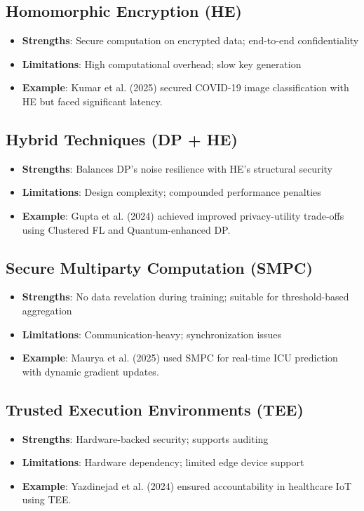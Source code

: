\documentclass[12pt]{report}
\begin{document}
\subsection{Homomorphic Encryption (HE)}
\begin{itemize}
    \item \textbf{Strengths}: Secure computation on encrypted data; end-to-end confidentiality
    \item \textbf{Limitations}: High computational overhead; slow key generation
    \item \textbf{Example}: Kumar et al. (2025) secured COVID-19 image classification with HE but faced significant latency.
\end{itemize}

\subsection{Hybrid Techniques (DP + HE)}
\begin{itemize}
    \item \textbf{Strengths}: Balances DP’s noise resilience with HE’s structural security
    \item \textbf{Limitations}: Design complexity; compounded performance penalties
    \item \textbf{Example}: Gupta et al. (2024) achieved improved privacy-utility trade-offs using Clustered FL and Quantum-enhanced DP.
\end{itemize}

\subsection{Secure Multiparty Computation (SMPC)}
\begin{itemize}
    \item \textbf{Strengths}: No data revelation during training; suitable for threshold-based aggregation
    \item \textbf{Limitations}: Communication-heavy; synchronization issues
    \item \textbf{Example}: Maurya et al. (2025) used SMPC for real-time ICU prediction with dynamic gradient updates.
\end{itemize}

\subsection{Trusted Execution Environments (TEE)}
\begin{itemize}
    \item \textbf{Strengths}: Hardware-backed security; supports auditing
    \item \textbf{Limitations}: Hardware dependency; limited edge device support
    \item \textbf{Example}: Yazdinejad et al. (2024) ensured accountability in healthcare IoT using TEE.
\end{itemize}
\end{document}
